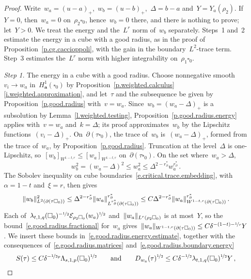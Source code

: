 \documentclass[11pt,letterpaper]{article}
\numberwithin{equation}{section}
\theoremstyle{definition}
\renewcommand{\a}{\mathbf{a}}
\newcommand{\nf}{\nicefrac}
\newcommand{\cu}{\square}
\DeclarePairedDelimiter{\norm}{\lVert}{\rVert}
\newcommand{\Ener}{\mathcal E}
\begin{document}
\begin{proof}
Write~$w_a=(u-a)_+$,~$w_b=(u-b)_+$,~$\Delta=b-a$ and~$Y=Y_a(\rho_2)$. If~$Y=0$, then~$w_a=0$ on~$\rho_2\cu_0$, hence~$w_b=0$ there, and there is nothing to prove; let~$Y>0$. We treat the energy and the~$L^r$ norm of~$w_b$ separately. Steps~1 and~2 estimate the energy in a cube with a good radius, as in the proof of Proposition~\ref{p.cg.caccioppoli}, with the gain in the boundary~$L^2$-trace term. Step~3 estimates the~$L^r$ norm with higher integrability on~$\rho_1\cu_0$.

\smallskip

\emph{Step 1.} The energy in a cube with a good radius. Choose nonnegative smooth~$v_i\to w_a$ in~$H^1_\a(\cu_0)$ by Proposition~\ref{p.weighted.calculus}\ref{i.weighted.approximation}, and let~$\tau$ and the subsequence be given by Proposition~\ref{p.good.radius} with~$v=w_a$. Since~$w_b=(w_a-\Delta)_+$ is a subsolution by Lemma~\ref{l.weighted.testing}, Proposition~\ref{p.good.radius.energy} applies with~$v=w_a$ and~$k=\Delta$; its proof approximates~$w_b$ by the Lipschitz functions~$(v_i-\Delta)_+$. On~$\partial(\tau\cu_0)$, the trace of~$w_b$ is~$(w_a-\Delta)_+$, formed from the trace of~$w_a$, by Proposition~\ref{p.good.radius}. Truncation at the level~$\Delta$ is one-Lipschitz, so~$[w_b]_{W^{1-t,r}}\leq[w_a]_{W^{1-t,r}}$ on~$\partial(\tau\cu_0)$. On the set where~$w_a>\Delta$,
\begin{equation*}
	w_b^2=(w_a-\Delta)^2\leq w_a^2\leq\Delta^{2-r_\partial^*}w_a^{r_\partial^*}\,.
\end{equation*}
The Sobolev inequality on cube boundaries~\eqref{e.critical.trace.embedding}, with~$\alpha=1-t$ and~$\xi=r$, then gives
\begin{equation*}
	\norm{w_b}_{L^2(\partial(\tau\cu_0))}^2\leq\Delta^{2-r_\partial^*}\norm{w_a}_{L^{r_\partial^*}(\partial(\tau\cu_0))}^{r_\partial^*}\leq C\Delta^{2-r_\partial^*}\norm{w_a}_{W^{1-t,r}(\partial(\tau\cu_0))}^{r_\partial^*}\,.
\end{equation*}
Each of~$\lambda_{t,1,q}(\cu_0)^{-\nf12}\Ener_{\rho_2\cu_0}(w_a)^{\nf12}$ and~$\norm{w_a}_{L^r(\rho_2\cu_0)}$ is at most~$Y$, so the bound~\eqref{e.good.radius.fractional} for~$w_a$ gives~$\norm{w_a}_{W^{1-t,r}(\partial(\tau\cu_0))}\leq C\delta^{-(1-t)-\nf1r}Y$. We insert these bounds in~\eqref{e.good.radius.energy.estimate}, together with the consequences of~\eqref{e.good.radius.matrices} and~\eqref{e.good.radius.boundary.energy}
\begin{equation*}
	S(\tau)\leq C\delta^{-\nf1{2p}}\Lambda_{s,1,p}(\cu_0)^{\nf12}\qquad\mbox{and}\qquad D_{w_a}(\tau)^{\nf12}\leq C\delta^{-\nf12}\lambda_{t,1,q}(\cu_0)^{\nf12}Y\,,

\end{equation*}
\end{proof}
\end{document}
